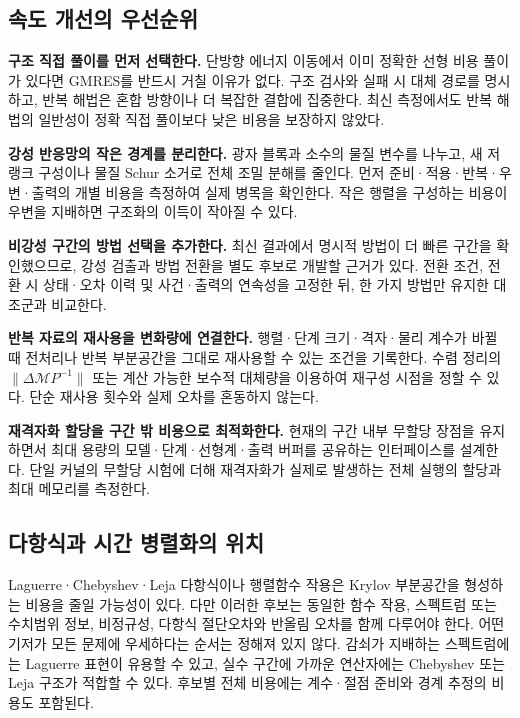 \documentclass[
  10pt,
  a4paper,
]{article}
\begin{document}
\hypertarget{uxc18duxb3c4-uxac1cuxc120uxc758-uxc6b0uxc120uxc21cuxc704}{%
\subsection{속도 개선의
우선순위}\label{uxc18duxb3c4-uxac1cuxc120uxc758-uxc6b0uxc120uxc21cuxc704}}

\textbf{구조 직접 풀이를 먼저 선택한다.} 단방향 에너지 이동에서 이미
정확한 선형 비용 풀이가 있다면 GMRES를 반드시 거칠 이유가 없다. 구조
검사와 실패 시 대체 경로를 명시하고, 반복 해법은 혼합 방향이나 더 복잡한
결합에 집중한다. 최신 측정에서도 반복 해법의 일반성이 정확 직접 풀이보다
낮은 비용을 보장하지 않았다.

\textbf{강성 반응망의 작은 경계를 분리한다.} 광자 블록과 소수의 물질
변수를 나누고, 새 저랭크 구성이나 물질 Schur 소거로 전체 조밀 분해를
줄인다. 먼저 준비·적용·반복·우변·출력의 개별 비용을 측정하여 실제 병목을
확인한다. 작은 행렬을 구성하는 비용이 우변을 지배하면 구조화의 이득이
작아질 수 있다.

\textbf{비강성 구간의 방법 선택을 추가한다.} 최신 결과에서 명시적 방법이
더 빠른 구간을 확인했으므로, 강성 검출과 방법 전환을 별도 후보로 개발할
근거가 있다. 전환 조건, 전환 시 상태·오차 이력 및 사건·출력의 연속성을
고정한 뒤, 한 가지 방법만 유지한 대조군과 비교한다.

\textbf{반복 자료의 재사용을 변화량에 연결한다.} 행렬·단계
크기·격자·물리 계수가 바뀔 때 전처리나 반복 부분공간을 그대로 재사용할
수 있는 조건을 기록한다. 수렴 정리의 \(\|\Delta\mathcal MP^{-1}\|\) 또는
계산 가능한 보수적 대체량을 이용하여 재구성 시점을 정할 수 있다. 단순
재사용 횟수와 실제 오차를 혼동하지 않는다.

\textbf{재격자화 할당을 구간 밖 비용으로 최적화한다.} 현재의 구간 내부
무할당 장점을 유지하면서 최대 용량의 모델·단계·선형계·출력 버퍼를
공유하는 인터페이스를 설계한다. 단일 커널의 무할당 시험에 더해
재격자화가 실제로 발생하는 전체 실행의 할당과 최대 메모리를 측정한다.

\hypertarget{uxb2e4uxd56duxc2dduxacfc-uxc2dcuxac04-uxbcd1uxb82cuxd654uxc758-uxc704uxce58}{%
\subsection{다항식과 시간 병렬화의
위치}\label{uxb2e4uxd56duxc2dduxacfc-uxc2dcuxac04-uxbcd1uxb82cuxd654uxc758-uxc704uxce58}}

Laguerre·Chebyshev·Leja 다항식이나 행렬함수 작용은 Krylov 부분공간을
형성하는 비용을 줄일 가능성이 있다. 다만 이러한 후보는 동일한 함수 작용,
스펙트럼 또는 수치범위 정보, 비정규성, 다항식 절단오차와 반올림 오차를
함께 다루어야 한다. 어떤 기저가 모든 문제에 우세하다는 순서는 정해져
있지 않다. 감쇠가 지배하는 스펙트럼에는 Laguerre 표현이 유용할 수 있고,
실수 구간에 가까운 연산자에는 Chebyshev 또는 Leja 구조가 적합할 수 있다.
후보별 전체 비용에는 계수·절점 준비와 경계 추정의 비용도 포함된다.
\end{document}
